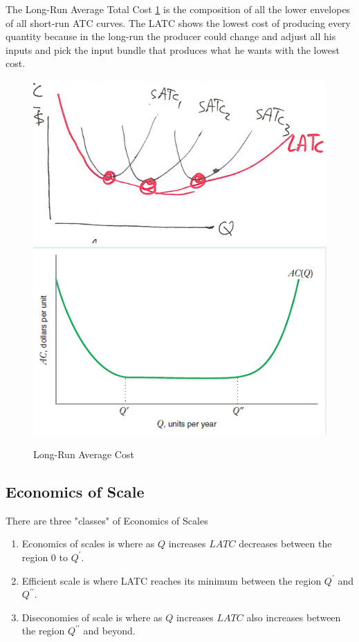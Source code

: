 \documentclass[../ECON-281-Notes.tex]{subfiles}
\begin{document}
The Long-Run Average Total Cost \cref{fig:LRAC} is the composition of all the lower envelopes of all short-run ATC curves. The LATC shows the lowest cost of producing every quantity because in the long-run the producer could change and adjust all his inputs and pick the input bundle that produces what he wants with the lowest cost. 
\begin{figure}[h]
    \centering
    \includegraphics[width=\columnwidth]{../assets/LRAC-0.png}   
    \includegraphics[width=\columnwidth]{../assets/LRAC.png}   
    \caption{Long-Run Average Cost}
    \label{fig:LRAC}
\end{figure}

\subsection{Economics of Scale}
There are three "classes" of Economics of Scales
\begin{enumerate}
    \item Economics of scales is where as \(Q\) increases \(LATC\) decreases between the region \(0\) to \(Q^\prime\).
    \item Efficient scale is where LATC reaches its minimum between the region \(Q^\prime\) and \(Q^{\prime \prime}\).
    \item Diseconomies of scale is where as \(Q\) increases \(LATC\) also increases between the region \(Q^{\prime \prime}\) and beyond. 
\end{enumerate}
\end{document}
